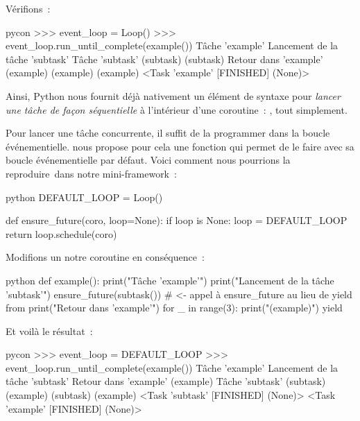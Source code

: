 \documentclass[small]{zmdocument}
\begin{document}
Vérifions :



\begin{CodeBlock}{pycon}
>>> event_loop = Loop()
>>> event_loop.run_until_complete(example())
Tâche 'example'
Lancement de la tâche 'subtask'
Tâche 'subtask'
(subtask)
(subtask)
Retour dans 'example'
(example)
(example)
(example)
<Task 'example' [FINISHED] (None)>
\end{CodeBlock}



Ainsi, Python nous fournit déjà nativement un élément de syntaxe pour \textit{lancer
une tâche de façon séquentielle} à l’intérieur d’une coroutine : , tout simplement.





Pour lancer une tâche concurrente, il suffit de la programmer dans la boucle événementielle.  nous propose pour cela une fonction  qui permet de le faire avec sa boucle événementielle par défaut. Voici comment nous pourrions la reproduire dans notre mini-framework :



\begin{CodeBlock}{python}
DEFAULT_LOOP = Loop()


def ensure_future(coro, loop=None):
    if loop is None:
        loop = DEFAULT_LOOP
    return loop.schedule(coro)
\end{CodeBlock}



Modifions un notre coroutine  en conséquence :



\begin{CodeBlock}{python}
def example():
    print("Tâche 'example'")
    print("Lancement de la tâche 'subtask'")
    ensure_future(subtask())   # <- appel à ensure_future au lieu de yield from
    print("Retour dans 'example'")
    for _ in range(3):
        print("(example)")
        yield
\end{CodeBlock}



Et voilà le résultat :



\begin{CodeBlock}{pycon}
>>> event_loop = DEFAULT_LOOP
>>> event_loop.run_until_complete(example())
Tâche 'example'
Lancement de la tâche 'subtask'
Retour dans 'example'
(example)
Tâche 'subtask'
(subtask)
(example)
(subtask)
(example)
<Task 'subtask' [FINISHED] (None)>
<Task 'example' [FINISHED] (None)>
\end{CodeBlock}
\end{document}
